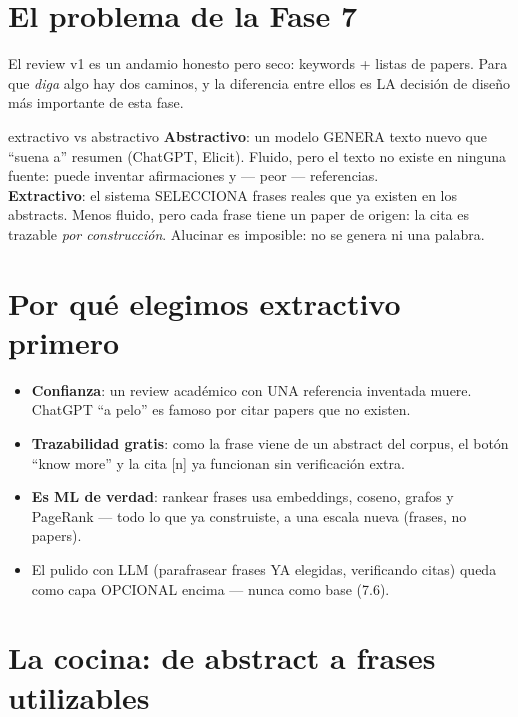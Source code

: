 \documentclass[11pt,a4paper]{article}
\begin{document}

\section{El problema de la Fase 7}

El review v1 es un andamio honesto pero seco: keywords + listas de papers. Para que
\emph{diga} algo hay dos caminos, y la diferencia entre ellos es LA decisión de diseño
más importante de esta fase.

\begin{concepto}{extractivo vs abstractivo}
\textbf{Abstractivo}: un modelo GENERA texto nuevo que ``suena a'' resumen (ChatGPT,
Elicit). Fluido, pero el texto no existe en ninguna fuente: puede inventar afirmaciones
y --- peor --- referencias. \\
\textbf{Extractivo}: el sistema SELECCIONA frases reales que ya existen en los abstracts.
Menos fluido, pero cada frase tiene un paper de origen: la cita es trazable
\emph{por construcción}. Alucinar es imposible: no se genera ni una palabra.
\end{concepto}

\section{Por qué elegimos extractivo primero}

\begin{itemize}
  \item \textbf{Confianza}: un review académico con UNA referencia inventada muere.
        ChatGPT ``a pelo'' es famoso por citar papers que no existen.
  \item \textbf{Trazabilidad gratis}: como la frase viene de un abstract del corpus,
        el botón ``know more'' y la cita [n] ya funcionan sin verificación extra.
  \item \textbf{Es ML de verdad}: rankear frases usa embeddings, coseno, grafos y
        PageRank --- todo lo que ya construiste, a una escala nueva (frases, no papers).
  \item El pulido con LLM (parafrasear frases YA elegidas, verificando citas) queda como
        capa OPCIONAL encima --- nunca como base (7.6).
\end{itemize}

\section{La cocina: de abstract a frases utilizables}
\end{document}
